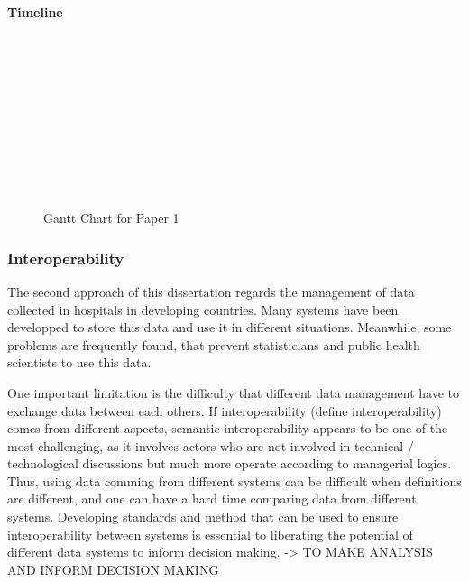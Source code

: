 \documentclass[a4paper,11pt,final,twoside]{article}
\begin{document}
\paragraph{Timeline}

\begin{figure}[h]
\begin{ganttchart}{1}{24}
 \\
 \\
 \\
 \\
 \\
 \\
 \\
 \\
 \\
\end{ganttchart}
\caption{Gantt Chart for Paper 1}
\end{figure}


        \subsubsection{Interoperability }

The second approach of this dissertation regards the management of data collected in hospitals in developing countries. Many systems have been developped to store this data and use it in different situations. Meanwhile, some problems are frequently found, that prevent statisticians and public health scientists to use this data.

One important limitation is the difficulty that different data management have to exchange data between each others. If interoperability (define interoperability) comes from different aspects, semantic interoperability appears to be one of the most challenging, as it involves actors who are not involved in technical / technological discussions but much more operate according to managerial logics. Thus, using data comming from different systems can be difficult when definitions are different, and one can have a hard time comparing data from different systems. Developing standards and method that can be used to ensure interoperability between systems is essential to liberating the potential of different data systems to inform decision making. -> TO MAKE ANALYSIS AND INFORM DECISION MAKING
\end{document}
